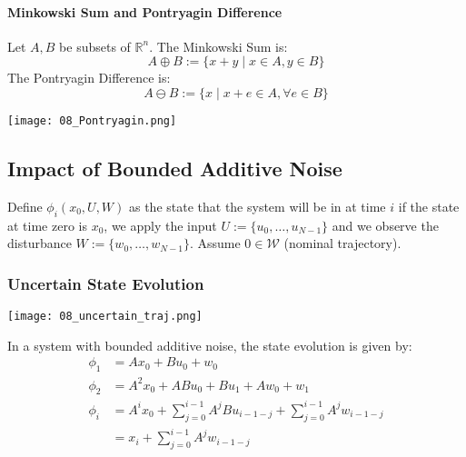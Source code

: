 \paragraph{Minkowski Sum and Pontryagin Difference}

Let $A,B$ be subsets of $\mathbb{R}^n$. The Minkowski Sum is:
\begin{equation*}
    A \oplus B := \{x + y \mid x \in A, y \in B\}
\end{equation*}
The Pontryagin Difference is:
\begin{equation*}
    A \ominus B := \{x \mid x + e \in A, \forall e \in B\}
\end{equation*}
\begin{center}
    \texttt{[image: 08\_Pontryagin.png]}
\end{center}

\subsection{Impact of Bounded Additive Noise}
Define $\phi_i(x_0, U, W)$ as the state that the system will be in at time $i$ if the state at time zero is $x_0$, we apply the input $U := \{u_0, \ldots, u_{N-1}\}$ and we observe the disturbance $W := \{w_0, \ldots, w_{N-1}\}$. Assume $0\in \mathcal{W}$ (nominal trajectory).
\subsubsection{Uncertain State Evolution}
\begin{center}
    \texttt{[image: 08\_uncertain\_traj.png]}
\end{center}
In a system with bounded additive noise, the state evolution is given by:
\begin{align*}
    \phi_{1} & =Ax_{0}+Bu_{0}+w_{0}                                                       \\
    \phi_{2} & =A^{2}x_{0}+ABu_{0}+Bu_{1}+Aw_{0}+w_{1}                                    \\
    \phi_{i} & =A^{i}x_{0}+\sum_{j=0}^{i-1}A^{j}Bu_{i-1-j}+\sum_{j=0}^{i-1}A^{j}w_{i-1-j} \\
             & =x_{i}+\sum_{j=0}^{i-1}A^{j}w_{i-1-j}
\end{align*}

